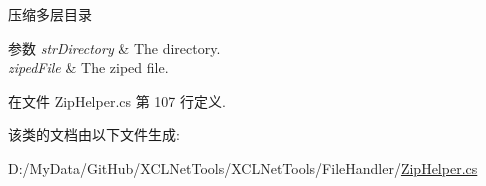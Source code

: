压缩多层目录 


\begin{DoxyParams}{参数}
{\em str\+Directory} & The directory.\\
\hline
{\em ziped\+File} & The ziped file.\\
\hline
\end{DoxyParams}


在文件 Zip\+Helper.\+cs 第 107 行定义.



该类的文档由以下文件生成\+:\begin{DoxyCompactItemize}
\item 
D\+:/\+My\+Data/\+Git\+Hub/\+X\+C\+L\+Net\+Tools/\+X\+C\+L\+Net\+Tools/\+File\+Handler/\hyperlink{_zip_helper_8cs}{Zip\+Helper.\+cs}\end{DoxyCompactItemize}
